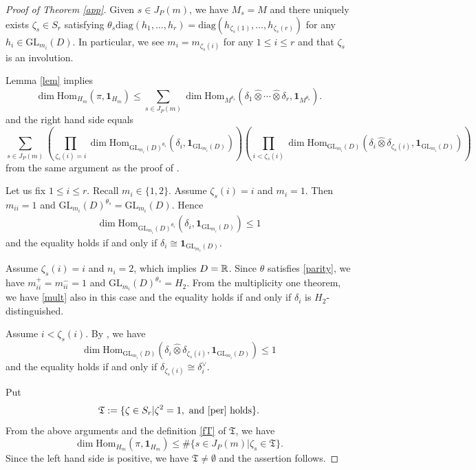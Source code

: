 \documentclass[11pt,letterpaper]{amsart}
\newcommand{\GL}{{\mathrm {GL}}} \newcommand{\PGL}{{\mathrm {PGL}}}
\newcommand{\Hom}{\mathrm{Hom}}
\newcommand{\triv}{{\mathbf{1}}}
\newcommand{\z}{\zeta}
\newcommand{\fT}{\mathfrak{T}}
\def\diag{\mathrm{diag}}
\theoremstyle{plain}
\numberwithin{equation}{section}
\begin{document}
\begin{proof}[Proof of Theorem \ref{app}]
Given $s\in J_P(m)$, we have $M_s=M$ and there uniquely exists $\z_s\in S_r$ satisfying 
$\theta_s\diag(h_1,\ldots,h_r)=\diag(h_{\z_s(1)},\ldots, h_{\z_s(r)})$ for any $h_i\in\GL_{m_i}(D)$. In particular, we see $m_i=m_{\z_s(i)}$ for any $1\le i\le r$ and that $\z_s$ is an involution. 

Lemma \ref{lem} implies
    \[
    \dim\Hom_{H_m}(\pi,\triv_{H_m})\le \sum_{s\in J_P(m)}
    \dim\Hom_{M^{\theta_s}}(\delta_1\hat{\otimes}\cdots\hat{\otimes}\delta_r,\triv_{M^{\theta_s}}).
    \]
and the right hand side equals 
    \[
    \sum_{s\in J_P(m)}
    \left(\prod_{\z_s(i)=i}\dim\Hom_{\GL_{m_i}(D)^{\theta_s}}(\delta_i,\triv_{\GL_{m_i}(D)})\right)
    \left(\prod_{i<\z_s(i)}\dim\Hom_{\GL_{m_i}(D)}(\delta_i\hat{\otimes}\delta_{\z_s(i)},\triv_{\GL_{m_i}(D)})\right)
    \]
from the same argument as the proof of \cite[Theorem 5.13]{ST}.

Let us fix $1\le i\le r$. Recall $m_i\in\{1,2\}$. 
Assume $\z_s(i)=i$ and $m_i=1$. Then $m_{ii}=1$ and $\GL_{m_i}(D)^{\theta_s}=\GL_{m_i}(D)$. Hence 
    \begin{align}\label{mult}
    \dim\Hom_{\GL_{m_i}(D)^{\theta_s}}(\delta_i,\triv_{\GL_{m_i}(D)})\le 1
    \end{align}
and the equality holds if and only if $\delta_i\cong \triv_{\GL_{m_i}(D)}$. 

Assume $\z_s(i)=i$ and $n_i=2$, which implies $D={\mathbb {R}}$. 
Since $\theta$ satisfies \eqref{parity}, we have $m_{ii}^+=m_{ii}^-=1$ and $\GL_{m_i}(D)^{\theta_s}=H_2$. 
From the multiplicity one theorem,  we have \eqref{mult} also in this case and the equality holds if and only if $\delta_i$ is $H_2$-distinguished.

Assume $i<\z_s(i)$. By \cite[Lemma 3.9]{ST}, we have 
    \[
    \dim\Hom_{\GL_{m_i}(D)}(\delta_i\hat{\otimes}\delta_{\z_s(i)},\triv_{\GL_{m_i}(D)})\le 1
    \]
and the equality holds if and only if $\delta_{\z_s(i)}\cong\delta_i^{\vee}$. 

Put 
    \begin{align}\label{fT}
    \fT:=
    \{\z\in S_r | 
    \z^2=1, \text{ and \eqref{per} holds}
    \}.
    \end{align}
From the above arguments and the definition \eqref{fT} of $\fT$, we have 
    \[
    \dim\Hom_{H_m}(\pi,\triv_{H_m})\le \#\{s\in J_P(m) | \z_s\in \fT\}.
    \] 
Since the left hand side is positive, we have $\fT\neq \emptyset$ and the assertion follows.
\end{proof}


	
	
	
\end{document}
